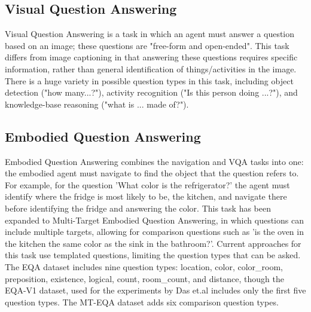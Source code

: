 \documentclass{article}
\begin{document}
\subsection{Visual Question Answering}
Visual Question Answering is a task in which an agent must answer a question based on an image; these questions are "free-form and open-ended"\cite{vqa_2015}. This task differs from image captioning in that answering these questions requires specific information, rather than general identification of things/activities in the image. There is a huge variety in possible question types in this task, including object detection ("how many...?"), activity recognition ("Is this person doing ...?"), and knowledge-base reasoning ("what is ... made of?"). 

\subsection{Embodied Question Answering}
Embodied Question Answering combines the navigation and VQA tasks into one: the embodied agent must navigate to find the object that the question refers to\cite{embodiedqa}. For example, for the question 'What color is the refrigerator?' the agent must identify where the fridge is most likely to be, the kitchen, and navigate there before identifying the fridge and answering the color. This task has been expanded to Multi-Target Embodied Question Answering, in which questions can include multiple targets, allowing for comparison questions such as 'is the oven in the kitchen the same color as the sink in the bathroom?'\cite{eqa_multitarget}. Current approaches for this task use templated questions, limiting the question types that can be asked. The EQA dataset includes nine question types: location, color, color\_room, preposition, existence, logical, count, room\_count, and distance, though the EQA-V1 dataset, used for the experiments by Das et.al includes only the first five question types\cite{embodiedqa}. The MT-EQA dataset adds six comparison question types\cite{eqa_multitarget}.

\end{document}
